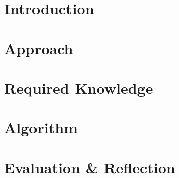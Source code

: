 \section{Introduction}




\section{Approach}



\section{Required Knowledge}



\section{Algorithm}



\section{Evaluation \& Reflection}